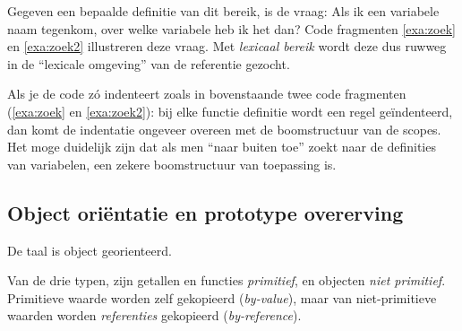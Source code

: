 Gegeven een bepaalde definitie van dit bereik, is de vraag: Als ik een variabele naam tegenkom, over welke variabele heb ik het dan? Code fragmenten \ref{exa:zoek} en \ref{exa:zoek2} illustreren deze vraag. Met \emph{lexicaal bereik} wordt deze dus ruwweg in de ``lexicale omgeving'' van de referentie gezocht.

\codeFragmentCaption
{}

\codeFragmentCaption
{}

Als je de code zó indenteert zoals in bovenstaande twee code fragmenten (\ref{exa:zoek} en \ref{exa:zoek2}): bij elke functie definitie wordt een regel geïndenteerd, dan komt de indentatie ongeveer overeen met de boomstructuur van de scopes. Het moge duidelijk zijn dat als men ``naar buiten toe'' zoekt naar de definities van variabelen, een zekere boomstructuur van toepassing is.

\subsection{Object oriëntatie en prototype overerving}

De taal is object georienteerd.

\newCodeFragment
{}

Van de drie typen, zijn getallen en functies \emph{primitief}, en objecten \emph{niet primitief}. Primitieve waarde worden zelf gekopieerd (\emph{by-value}), maar van niet-primitieve waarden worden \emph{referenties} gekopieerd (\emph{by-reference}).

